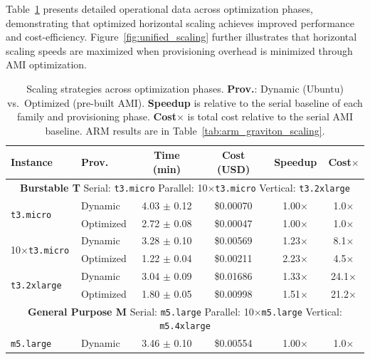 \documentclass[conference]{IEEEtran}
\begin{document}
Table~\ref{tab:scaling_all_families} presents detailed operational data across
optimization phases, demonstrating that optimized horizontal scaling achieves
improved performance and cost-efficiency.
Figure~\ref{fig:unified_scaling} further illustrates that horizontal scaling
speeds are maximized when provisioning overhead is minimized through AMI
optimization.

\begin{table}[!htbp]
\centering
\caption{Scaling strategies across optimization phases. \textbf{Prov.}: Dynamic (Ubuntu) vs.\ Optimized (pre-built AMI). \textbf{Speedup} is relative to the serial baseline of each family and provisioning phase. \textbf{Cost$\times$} is total cost relative to the serial AMI baseline. ARM results are in Table~\ref{tab:arm_graviton_scaling}.}
\label{tab:scaling_all_families}
\footnotesize
\begin{tabular}{llcccc}
\toprule
\textbf{Instance} & \textbf{Prov.} & \textbf{Time (min)} & \textbf{Cost (USD)} & \textbf{Speedup} & \textbf{Cost$\times$} \\
\midrule
\multicolumn{6}{c}{\textbf{Burstable T} \quad Serial: \texttt{t3.micro} \quad Parallel: 10$\times$\texttt{t3.micro} \quad Vertical: \texttt{t3.2xlarge}} \\
\midrule
\multirow{2}{*}{\texttt{t3.micro}}      & Dynamic   & 4.03 $\pm$ 0.12 & \$0.00070 & 1.00$\times$ & 1.0$\times$ \\
                                         & Optimized & 2.72 $\pm$ 0.08 & \$0.00047 & 1.00$\times$ & 1.0$\times$ \\
\multirow{2}{*}{10$\times$\texttt{t3.micro}} & Dynamic   & 3.28 $\pm$ 0.10 & \$0.00569 & 1.23$\times$ & 8.1$\times$ \\
                                         & Optimized & 1.22 $\pm$ 0.04 & \$0.00211 & 2.23$\times$ & 4.5$\times$ \\
\multirow{2}{*}{\texttt{t3.2xlarge}}    & Dynamic   & 3.04 $\pm$ 0.09 & \$0.01686 & 1.33$\times$ & 24.1$\times$ \\
                                         & Optimized & 1.80 $\pm$ 0.05 & \$0.00998 & 1.51$\times$ & 21.2$\times$ \\
\midrule
\multicolumn{6}{c}{\textbf{General Purpose M} \quad Serial: \texttt{m5.large} \quad Parallel: 10$\times$\texttt{m5.large} \quad Vertical: \texttt{m5.4xlarge}} \\
\midrule
\multirow{2}{*}{\texttt{m5.large}}      & Dynamic   & 3.46 $\pm$ 0.10 & \$0.00554 & 1.00$\times$ & 1.0$\times$ \\

\end{tabular}
\end{table}
\end{document}

